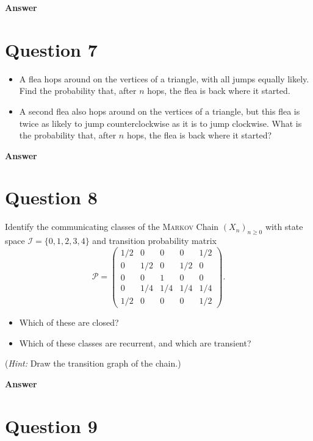 \documentclass[letterpaper]{article}
\begin{document}
		\textbf{Answer}
		
		\clearpage
		
		\section{Question 7}
		
		\begin{itemize}
			\item[(a)] A flea hops around on the vertices of a triangle, with all jumps equally likely. Find the probability that, after $n$ hops, the flea is back where it started.
			\item[(b)] A second flea also hops around on the vertices of a triangle, but this flea is twice as likely to jump counterclockwise as it is to jump clockwise. What is the probability that, after $n$ hops, the flea is back where it started?
		\end{itemize}
		
		\textbf{Answer}
		
		\clearpage
		
		\section{Question 8}
		
		Identify the communicating classes of the \textsc{Markov} Chain $(X_n)_{n \geq 0}$ with state space $\mathcal{I} = \{0, 1, 2, 3, 4\}$ and transition probability matrix
		\[
		\mathcal{P} = \begin{pmatrix}
			1/2 & 0   & 0   & 0   & 1/2 \\
			0   & 1/2 & 0   & 1/2 & 0   \\
			0   & 0   & 1   & 0   & 0   \\
			0   & 1/4 & 1/4 & 1/4 & 1/4 \\
			1/2 & 0   & 0   & 0   & 1/2
		\end{pmatrix}.
		\]
		\begin{itemize}
			\item[(a)] Which of these are closed?
			\item[(b)] Which of these classes are recurrent, and which are transient?
		\end{itemize}
		(\textit{Hint:} Draw the transition graph of the chain.)
		
		\textbf{Answer}
		
		\clearpage
		
		\section{Question 9}
		
\end{document}
